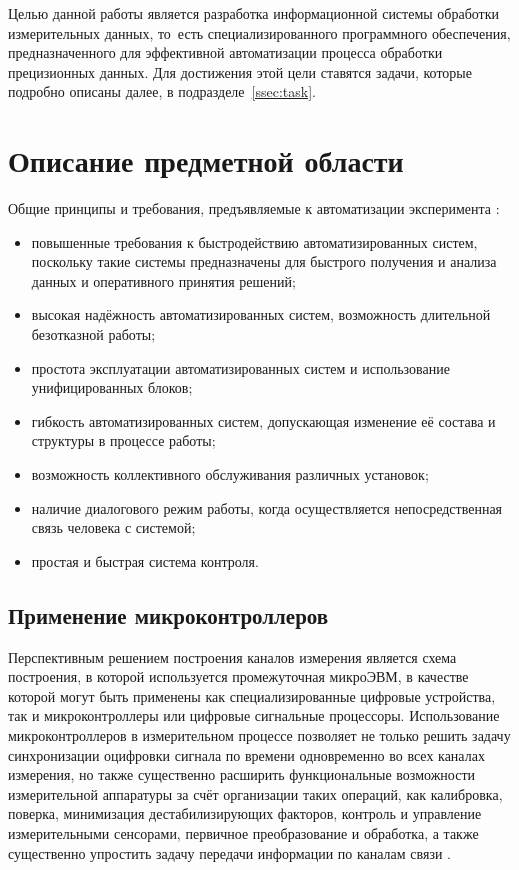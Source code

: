 \documentclass[a4paper, 14pt]{extarticle}
\begin{document}
  Целью данной работы является разработка информационной системы обработки измерительных данных,
  то~есть специализированного программного обеспечения, предназначенного для эффективной
  автоматизации процесса обработки прецизионных данных. Для достижения этой цели ставятся задачи,
  которые подробно описаны далее, в подразделе~\ref{ssec:task}.

  \section{Описание предметной области}

  Общие принципы и требования, предъявляемые к автоматизации эксперимента \cite{vinogradov-discrete, kurochkin-kamak}: %
  \begin{itemize}
    \item повышенные требования к быстродействию автоматизированных систем, поскольку такие системы
      предназначены для быстрого получения и анализа данных и оперативного принятия решений;
    \item высокая надёжность автоматизированных систем, возможность длительной безотказной работы;
    \item простота эксплуатации автоматизированных систем и использование унифицированных блоков;
    \item гибкость автоматизированных систем, допускающая изменение её состава и структуры в процессе работы;
    \item возможность коллективного обслуживания различных установок;
    \item наличие диалогового режим работы, когда осуществляется непосредственная связь человека с системой;
    \item простая и быстрая система контроля.
  \end{itemize}

  \subsection{Применение микроконтроллеров}

  Перспективным решением построения каналов измерения является схема построения, в которой
  используется промежуточная микроЭВМ, в качестве которой могут быть применены как
  специализированные цифровые устройства, так и микроконтроллеры или цифровые сигнальные процессоры.
  Использование микроконтроллеров в измерительном процессе позволяет не только решить задачу
  синхронизации оцифровки сигнала по времени одновременно во всех каналах измерения, но также
  существенно расширить функциональные возможности измерительной аппаратуры за счёт организации
  таких операций, как калибровка, поверка, минимизация дестабилизирующих факторов, контроль и
  управление измерительными сенсорами, первичное преобразование и обработка, а также существенно
  упростить задачу передачи информации по каналам связи \cite{klaassen-methods}.
\end{document}
